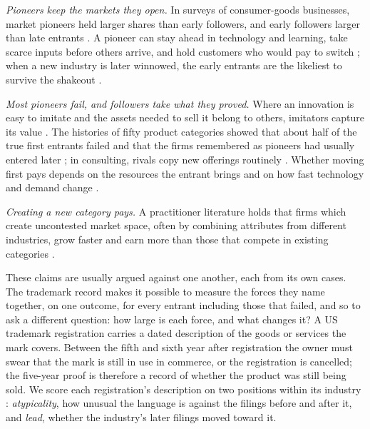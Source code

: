 \emph{Pioneers keep the markets they open.} In surveys of consumer-goods
businesses, market pioneers held larger shares than early followers, and
early followers larger than late entrants \citep{RobinsonFornell1985}. A
pioneer can stay ahead in technology and learning, take scarce inputs
before others arrive, and hold customers who would pay to switch
\citep{LiebermanMontgomery1988}; when a new industry is later winnowed,
the early entrants are the likeliest to survive the shakeout
\citep{KlepperMiller1995, Klepper1997}.

\emph{Most pioneers fail, and followers take what they proved.} Where an
innovation is easy to imitate and the assets needed to sell it belong to
others, imitators capture its value \citep{Teece1986}. The histories of
fifty product categories showed that about half of the true first
entrants failed and that the firms remembered as pioneers had usually
entered later \citep{GolderTellis1993}; in consulting, rivals copy new
offerings routinely \citep{SemadeniAnderson2010}. Whether moving first
pays depends on the resources the entrant brings
\citep{LiebermanMontgomery1998} and on how fast technology and demand
change \citep{SuarezLanzolla2007}.

\emph{Creating a new category pays.} A practitioner literature holds that
firms which create uncontested market space, often by combining
attributes from different industries, grow faster and earn more than
those that compete in existing categories \citep{KimMauborgne2004}.

These claims are usually argued against one another, each from its own
cases. The trademark record makes it possible to measure the forces they
name together, on one outcome, for every entrant including those that
failed, and so to ask a different question: how large is each force, and
what changes it? A US trademark registration carries a dated description
of the goods or services the mark covers. Between the fifth and sixth
year after registration the owner must swear that the mark is still in
use in commerce, or the registration is cancelled; the five-year proof
is therefore a record of whether the product was still being sold. We
score each registration's description on two positions within its
industry \citep{SilverCorpus2026}: \emph{atypicality}, how unusual the
language is against the filings before and after it, and \emph{lead},
whether the industry's later filings moved toward it.

